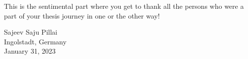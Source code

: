 
This is the sentimental part where you get to thank all the persons who were a part of your 
thesis journey in one or the other way!
		
Sajeev Saju Pillai\\
Ingolstadt, Germany\\
January 31, 2023